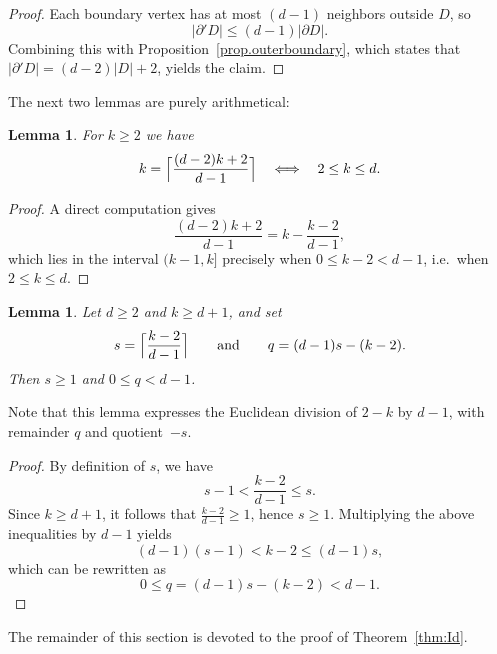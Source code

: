 \documentclass[a4paper, 11pt]{article}
\numberwithin{equation}{section}
\newtheorem{lemma}[theorem]{Lemma}
\theoremstyle{definition}
\theoremstyle{remark}
\begin{document}
\begin{proof}
Each boundary vertex has at most $(d-1)$ neighbors outside $D$, so 
\[
     |\partial' D|  \leq (d-1)|\partial D|.
\]
Combining this with Proposition~\ref{prop.outerboundary}, which states that $|\partial'D| =  (d-2)|D|+2$, yields the claim.
\end{proof}

The next two lemmas are purely arithmetical: 
\begin{lemma}\label{lem:smallk}
For $k\ge 2$ we have
\[
   k=\Bigl\lceil \frac{(d-2)k+2}{d-1}\Bigr\rceil  \quad\Longleftrightarrow\quad    2\le k\le d.
\]
\end{lemma}

\begin{proof}
A direct computation gives
\[
\frac{(d-2)k+2}{d-1}=k-\frac{k-2}{d-1},
\]
which lies in the interval $(k-1,k]$ precisely when $0\le k-2<d-1$, i.e.\ when $2\le k\le d$.
\end{proof}


\medskip 

\begin{lemma}\label{lem:division}
Let $d\ge 2$ and $k\ge d+1$, and set
\[
   s = \Bigl\lceil \frac{k-2}{d-1}\Bigr\rceil  \qquad \text{and} \qquad    q = (d-1)s-(k-2).
\]
Then $s\ge 1$ and $0\le q<d-1$.
\end{lemma}

Note that this  lemma expresses the Euclidean division of $2-k$ by $d-1$, with remainder $q$ and quotient~$-s$.


\begin{proof}
By definition of $s$, we have
\[
s-1<\frac{k-2}{d-1}\le s.
\]
Since $k\ge d+1$, it follows that $\frac{k-2}{d-1}\ge 1$, hence $s\ge 1$. Multiplying the above inequalities by $d-1$ yields
\[
(d-1)(s-1)< k-2 \le (d-1)s,
\]
which can be rewritten as
\[
0\le q=(d-1)s-(k-2)<d-1.
\]
\end{proof}

\medskip 

The remainder of this section is devoted to the proof of Theorem~\ref{thm:Id}.
\end{document}
